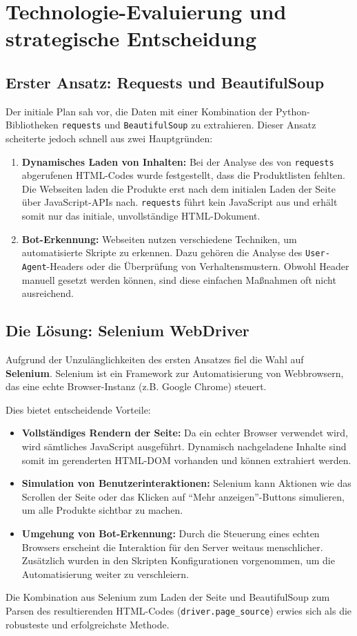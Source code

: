 \documentclass[12pt, a4paper]{report} %
\begin{document}
\section{Technologie-Evaluierung und strategische Entscheidung}
\subsection{Erster Ansatz: Requests und BeautifulSoup}
Der initiale Plan sah vor, die Daten mit einer Kombination der Python-Bibliotheken \texttt{requests} und \texttt{BeautifulSoup} zu extrahieren. Dieser Ansatz scheiterte jedoch schnell aus zwei Hauptgründen:
\begin{enumerate}
    \item \textbf{Dynamisches Laden von Inhalten:} Bei der Analyse des von \texttt{requests} abgerufenen HTML-Codes wurde festgestellt, dass die Produktlisten fehlten. Die Webseiten laden die Produkte erst nach dem initialen Laden der Seite über JavaScript-APIs nach. \texttt{requests} führt kein JavaScript aus und erhält somit nur das initiale, unvollständige HTML-Dokument.
    \item \textbf{Bot-Erkennung:} Webseiten nutzen verschiedene Techniken, um automatisierte Skripte zu erkennen. Dazu gehören die Analyse des \texttt{User-Agent}-Headers oder die Überprüfung von Verhaltensmustern. Obwohl Header manuell gesetzt werden können, sind diese einfachen Maßnahmen oft nicht ausreichend.
\end{enumerate}

\subsection{Die Lösung: Selenium WebDriver}
Aufgrund der Unzulänglichkeiten des ersten Ansatzes fiel die Wahl auf \textbf{Selenium}. Selenium ist ein Framework zur Automatisierung von Webbrowsern, das eine echte Browser-Instanz (z.B. Google Chrome) steuert.

Dies bietet entscheidende Vorteile:
\begin{itemize}
    \item \textbf{Vollständiges Rendern der Seite:} Da ein echter Browser verwendet wird, wird sämtliches JavaScript ausgeführt. Dynamisch nachgeladene Inhalte sind somit im gerenderten HTML-DOM vorhanden und können extrahiert werden.
    \item \textbf{Simulation von Benutzerinteraktionen:} Selenium kann Aktionen wie das Scrollen der Seite oder das Klicken auf "`Mehr anzeigen"'-Buttons simulieren, um alle Produkte sichtbar zu machen.
    \item \textbf{Umgehung von Bot-Erkennung:} Durch die Steuerung eines echten Browsers erscheint die Interaktion für den Server weitaus menschlicher. Zusätzlich wurden in den Skripten Konfigurationen vorgenommen, um die Automatisierung weiter zu verschleiern.
\end{itemize}
Die Kombination aus Selenium zum Laden der Seite und BeautifulSoup zum Parsen des resultierenden HTML-Codes (\texttt{driver.page\_source}) erwies sich als die robusteste und erfolgreichste Methode.
\end{document}

